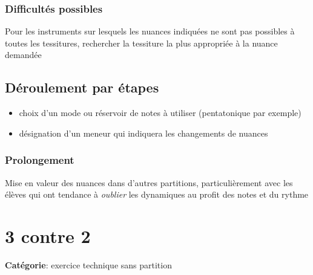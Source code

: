 \documentclass[a4paper,11pt,bibliography=totoc,numbers=noenddot,listof=flat,DIV=11,BCOR=0mm]{scrreprt}%
\newcommand{\betweenLilyPondSystem}[1]{\vspace{5mm}\linebreak}
\begin{document}
\subsection*{Difficultés possibles}
Pour les instruments sur lesquels les nuances indiquées ne sont pas possibles à toutes les tessitures, rechercher la tessiture la plus appropriée à la nuance demandée

\section*{Déroulement par étapes}
\begin{itemize}
\item choix d'un mode ou réservoir de notes à utiliser (pentatonique par exemple)
\item désignation d'un meneur qui indiquera les changements de nuances
\end{itemize}

\subsection*{Prolongement}
Mise en valeur des nuances dans d'autres partitions, particulièrement avec les élèves qui ont tendance à \emph{oublier} les dynamiques au profit des notes et du rythme


\vspace{0.2cm}
\renewcommand{\betweenLilyPondSystem}[1]{\vspace{10mm}\linebreak}


\renewcommand{\betweenLilyPondSystem}[1]{\vspace{5mm}\linebreak}

\chapter[Exercice technique sans partition: 3 contre 2]{3 contre 2}

{\large \textbf{Catégorie}}:
 exercice technique sans partition

\end{document}
